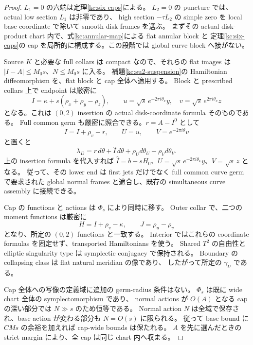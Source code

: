 \begin{proof}
$L_1=0$ の六端は定理\ref{kc:six-caps}による。
$L_2=0$ の puncture では、actual low section $L_1$ は非零であり、
high section $-\tau L_2$ の simple zero を local base coordinate で除いて smooth disk frames を選ぶ。
まずその actual disk-product chart 内で、式\eqref{kc:annular-map}による flat annular block と
定理\ref{kc:six-caps}の cap を局所的に構成する。この段階では global curve block へ接がない。

Source $K$ と必要な full collars は compact なので、それらの flat images は
$|I-A|\le M_0s$、$N\le M_0s$ に入る。
補題\ref{kc:su2-suspension}の Hamiltonian diffeomorphism を、flat block と cap 全体へ適用する。
Block と prescribed collars 上で endpoint は厳密に
\[
 I=\kappa+s(\rho_x+\rho_y-\rho_z),\qquad
 u=\sqrt s\,e^{-2\pi i\theta_x}y,
 \quad v=\sqrt s\,e^{2\pi i\theta_x}z
\]
となる。これは $(0,2)$ insertion の actual disk-coordinate formula そのものである。
Full common germ も厳密に照合できる。$r=A-I^0$ として
\[
 \widehat I=I+\rho_v-r,\qquad U=u,\qquad V=e^{-2\pi i\theta}v
\]
と置くと
\[
 \lambda_D=r\,d\theta+\widehat I\,d\theta
                +\rho_Ud\theta_U+\rho_Vd\theta_V.
\]
上の insertion formula を代入すれば
$\widehat I=b+sH_0$、$U=\sqrt s\,e^{-2\pi i\theta_x}y$、$V=\sqrt s\,z$ となる。
従って、その lower end は first jets だけでなく full common curve germ で要求された
global normal frames と適合し、既存の simultaneous curve assembly に接続できる。

Cap の functions と actions は $\Phi_s$ により同時に移す。
Outer collar で、二つの moment functions は厳密に
\[
 H=I+\rho_v-\kappa,\qquad J=\rho_u-\rho_v
\]
となり、所定の $(0,2)$ functions と一致する。
Interior ではこれらの coordinate formulas を固定せず、transported Hamiltonians を使う。
Shared $T^2$ の自由性と elliptic singularity type は symplectic conjugacy で保持される。
Boundary の collapsing class は flat natural meridian の像であり、
したがって所定の $\gamma_U$ である。

Cap 全体への写像の定義域に追加の germ-radius 条件はない。
$\Phi_s$ は既に wide chart 全体の symplectomorphism であり、
normal actions が $O(A)$ となる cap の深い部分では $N\gg s$ のため恒等である。
Normal action $N$ は全域で保存され、base action が変わる部分も $N=O(s)$ に限られる。
従って base bound に $CMs$ の余裕を加えれば cap-wide bounds は保たれる。
$A$ を先に選んだときの strict margin により、全 cap は同じ chart 内へ収まる。


\end{proof}

